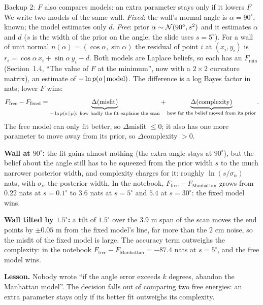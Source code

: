 \documentclass[11pt]{article}
\begin{document}
\begin{backupbox}{Backup 2: $F$ also compares models: an extra parameter stays only if it lowers $F$}
We write two models of the same wall. \emph{Fixed}: the wall's normal angle is $\alpha = 90^\circ$, known; the model estimates only $d$. \emph{Free}: prior $\alpha\sim\mathcal{N}(90^\circ, s^2)$ and it estimates $\alpha$ and $d$ ($s$ is the width of the prior on the angle; the slide uses $s = 5^\circ$). For a wall of unit normal $n(\alpha) = (\cos\alpha, \sin\alpha)$ the residual of point $i$ at $(x_i,y_i)$ is $r_i = \cos\alpha\,x_i + \sin\alpha\,y_i - d$. Both models are Laplace beliefs, so each has an $F_{\min}$ (Section~1.4, ``The value of $F$ at the minimum'', now with a $2\times2$ curvature matrix), an estimate of $-\ln p(o\,|\,\text{model})$. The difference is a log Bayes factor in nats; lower $F$ wins:
\[
F_{\text{free}} - F_{\text{fixed}} = \underbrace{\Delta(\text{misfit})}_{-\ln p(o\,|\,\mu):\ \text{how badly the fit explains the scan}} + \underbrace{\Delta(\text{complexity})}_{\text{how far the belief moved from its prior}} .
\]
The free model can only fit better, so $\Delta$misfit $\le 0$; it also has one more parameter to move away from its prior, so $\Delta$complexity $>0$.

\textbf{Wall at $90^\circ$:} the fit gains almost nothing (the extra angle stays at $90^\circ$), but the belief about the angle still has to be squeezed from the prior width $s$ to the much narrower posterior width, and complexity charges for it: roughly $\ln(s/\sigma_\alpha)$ nats, with $\sigma_\alpha$ the posterior width. In the notebook, $F_{\text{free}} - F_{\text{Manhattan}}$ grows from $0.22$ nats at $s = 0.1^\circ$ to $3.6$ nats at $s = 5^\circ$ and $5.4$ at $s = 30^\circ$: the fixed model wins.

\textbf{Wall tilted by $1.5^\circ$:} a tilt of $1.5^\circ$ over the $3.9$ m span of the scan moves the end points by $\pm 0.05$ m from the fixed model's line, far more than the $2$ cm noise, so the misfit of the fixed model is large. The accuracy term outweighs the complexity: in the notebook $F_{\text{free}} - F_{\text{Manhattan}} = -87.4$ nats at $s = 5^\circ$, and the free model wins.

\textbf{Lesson.} Nobody wrote ``if the angle error exceeds $k$ degrees, abandon the Manhattan model''. The decision falls out of comparing two free energies: an extra parameter stays only if its better fit outweighs its complexity.
\end{backupbox}

\end{document}
